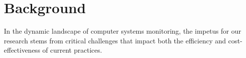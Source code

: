 \documentclass[conference]{IEEEtran}
\begin{document}

\section{Background}

In the dynamic landscape of computer systems monitoring, the impetus for our research stems from critical challenges that impact both the efficiency and cost-effectiveness of current practices. 
\end{document}
